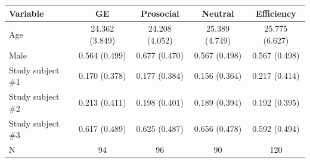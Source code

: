 \begin{tabular}{lcccc}
\hline
Variable & GE & Prosocial & Neutral & Efficiency \\
\hline
Age & 24.362 (3.849) & 24.208 (4.052) & 25.389 (4.749) & 25.775 (6.627) \\
Male & 0.564 (0.499) & 0.677 (0.470) & 0.567 (0.498) & 0.567 (0.498) \\
Study subject \#1 & 0.170 (0.378) & 0.177 (0.384) & 0.156 (0.364) & 0.217 (0.414) \\
Study subject \#2 & 0.213 (0.411) & 0.198 (0.401) & 0.189 (0.394) & 0.192 (0.395) \\
Study subject \#3 & 0.617 (0.489) & 0.625 (0.487) & 0.656 (0.478) & 0.592 (0.494) \\
N & 94 & 96 & 90 & 120 \\
\hline
\end{tabular}
